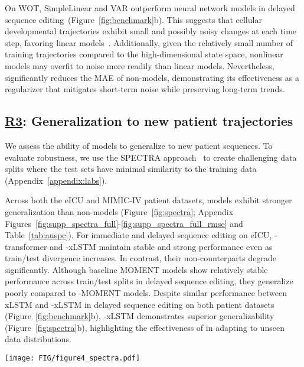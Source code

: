 On WOT, SimpleLinear and VAR outperform neural network models in delayed sequence editing~(Figure~\ref{fig:benchmark}b). This suggests that cellular developmental trajectories exhibit small and possibly noisy changes at each time step, favoring linear models~\cite{ahlmann2024deep, toner2024analysis}. Additionally, given the relatively small number of training trajectories compared to the high-dimensional state space, nonlinear models may overfit to noise more readily than linear models. Nevertheless, \name significantly reduces the MAE of non-\name models, demonstrating its effectiveness as a regularizer that mitigates short-term noise while preserving long-term trends.


\subsection{\underline{R3}: Generalization to new patient trajectories}


We assess the ability of \name models to generalize to new patient sequences. To evaluate robustness, we use the SPECTRA approach~\cite{ektefaie2024evaluating} to create challenging data splits where the test sets have minimal similarity to the training data (Appendix~\ref{appendix:labs}).

Across both the eICU and MIMIC-IV patient datasets, \name models exhibit stronger generalization than non-\name models (Figure~\ref{fig:spectra}; Appendix Figures~\ref{fig:supp_spectra_full}-\ref{fig:supp_spectra_full_rmse} and Table~\ref{tab:auspc}). For immediate and delayed sequence editing on eICU, \name-transformer and \name-xLSTM maintain stable and strong performance even as train/test divergence increases. In contrast, their non-\name counterparts degrade significantly. Although baseline MOMENT models show relatively stable performance across train/test splits in delayed sequence editing, they generalize poorly compared to \name-MOMENT models. Despite similar performance between xLSTM and \name-xLSTM in delayed sequence editing on both patient datasets (Figure~\ref{fig:benchmark}b), \name-xLSTM demonstrates superior generalizability (Figure~\ref{fig:spectra}b), highlighting the effectiveness of \name in adapting to unseen data distributions.




\begin{figure*}[ht]
\begin{center}
\centerline{\texttt{[image: FIG/figure4\_spectra.pdf]}}
\caption{Generalizability of \name on \textbf{(a)}~eICU and \textbf{(b)}~MIMIC-IV patient datasets in immediate and delayed sequence editing. As the SPECTRA parameter increases, the train/test split similarity decreases~(Appendix Figure~\ref{fig:supp_spectra_cso}). The area under the spectral performance curve (AUSPC) evaluation is in Appendix Table~\ref{tab:auspc}.}
\label{fig:spectra}
\end{center}
\vskip -0.35in
\end{figure*}



